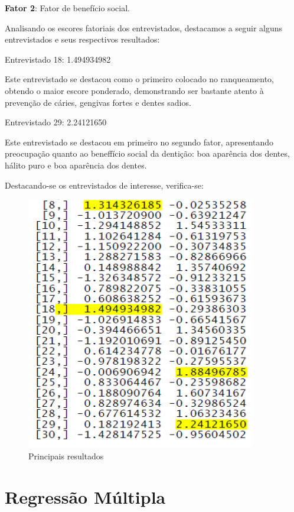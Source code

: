 \documentclass[12pt,brazil,oneside]{book}
\begin{document}
\textbf{Fator 2}: Fator de benefício social.

Analisando os escores fatoriais dos entrevistados, destacamos a seguir
alguns entrevistados e seus respectivos resultados:

Entrevistado 18: 1.494934982

Este entrevistado se destacou como o primeiro colocado no ranqueamento,
obtendo o maior escore ponderado, demonstrando ser bastante atento à
prevenção de cáries, gengivas fortes e dentes sadios.

Entrevistado 29: 2.24121650

Este entrevistado se destacou em primeiro no segundo fator, apresentando
preocupação quanto ao beneffício social da dentição: boa aparência dos
dentes, hálito puro e boa aparência dos dentes.

Destacando-se os entrevistados de interesse, verifica-se:

\begin{figure}[H]

{\centering \includegraphics[width=0.8\linewidth]{anfat2} 

}

\caption{Principais resultados}\label{fig:unnamed-chunk-34}
\end{figure}

\hypertarget{regressao-multipla}{%
\chapter{Regressão Múltipla}\label{regressao-multipla}}
\end{document}
